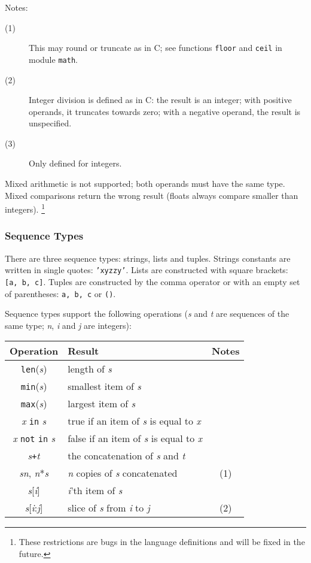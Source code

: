 \noindent
Notes:
\begin{description}
\item[(1)]
This may round or truncate as in C; see functions {\tt floor} and
{\tt ceil} in module {\tt math}.
\item[(2)]
Integer division is defined as in C: the result is an integer; with
positive operands, it truncates towards zero; with a negative operand,
the result is unspecified.
\item[(3)]
Only defined for integers.
\end{description}

Mixed arithmetic is not supported; both operands must have the same type.
Mixed comparisons return the wrong result (floats always compare smaller
than integers).%
\footnote{
These restrictions are bugs in the language definitions and will be
fixed in the future.
}
\subsubsection{Sequence Types}

There are three sequence types: strings, lists and tuples.
Strings constants are written in single quotes: {\tt 'xyzzy'}.
Lists are constructed with square brackets: {\tt [a,~b,~c]}.
Tuples are constructed by the comma operator or with an empty set of
parentheses: {\tt a,~b,~c} or {\tt ()}.

Sequence types support the following operations ({\em s} and {\em t} are
sequences of the same type; {\em n}, {\em i} and {\em j} are integers):

\begin{center}
\begin{tabular}{|c|l|c|}
\hline
Operation & Result & Notes \\
\hline
{\tt len}({\em s}) & length of {\em s} & \\
{\tt min}({\em s}) & smallest item of {\em s} & \\
{\tt max}({\em s}) & largest item of {\em s} & \\
{\em x} {\tt in} {\em s} &
	true if an item of {\em s} is equal to {\em x} & \\
{\em x} {\tt not} {\tt in} {\em s} &
	false if an item of {\em s} is equal to {\em x} & \\
{\em s}{\tt +}{\em t} & the concatenation of {\em s} and {\em t} & \\
{\em s}{\tt *}{\em n}, {\em n}*{\em s} &
	{\em n} copies of {\em s} concatenated & (1) \\
{\em s}[{\em i}] & {\em i}'th item of {\em s} & \\
{\em s}[{\em i}:{\em j}] &
	slice of {\em s} from {\em i} to {\em j} & (2) \\
\hline
\end{tabular}
\end{center}

